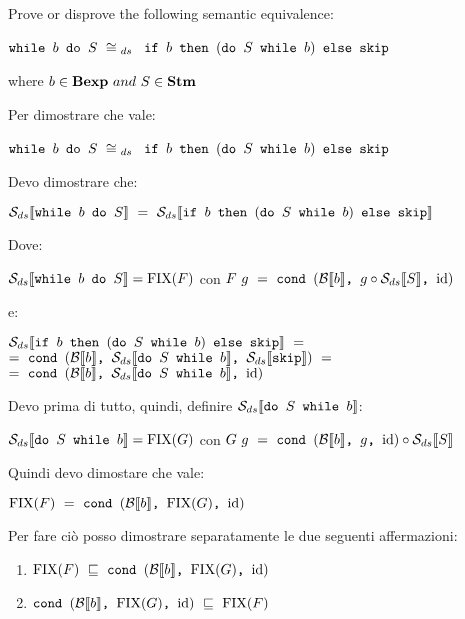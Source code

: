 \newcommand{\dSwb}[2]
{
    \mbox{\normalfont{\texttt{do }}}
    #1
    \textrm{\normalfont{\texttt{ while }}}
    #2
}
\newcommand{\exTen}
{
	$ \wbS{b}{S} ~\cong{}_{ds}~$
	{$\ifABC{b}{(\dSwb{S}{b})}{\skipistr}$}
}
\newcommand{\Sds}{\dsCtxt{S}}
\newcommand{\mineq}{\sqsubseteq}
\newcommand{\unionsem}[1]{\bigsqcup\limits_{n\geq{}0}}

{
	Prove or disprove the following semantic equivalence:
	\begin{center}
		\exTen{}
	\end{center}
	where $b\in\mbox{\textbf{Bexp}}~and~S\in\mbox{\textbf{Stm}}$
}
{
    Per dimostrare che vale:
    \begin{center}
    \exTen{}
    \end{center}
    Devo dimostrare che:
    \begin{center}
    $\dsCtxt{\wbS{b}{S}}~=~
    \dsCtxt{\ifABC{b}{(\dSwb{S}{b})}{\skipistr}}$
    \end{center}
    Dove:
    \begin{center}
    $\mathcal{S}_{ds}\llbracket \mbox{\normalfont{\texttt{while }}} b \textrm{\normalfont{\texttt{ do }}} S \rrbracket=\textrm{\normalfont{FIX}}(F)$ con 
    $F~g~=~\cond{b}{g \circ{} \Sds{}}{\idDS}$ \\
    \end{center}
    e:
    \begin{center}
    $\dsCtxt{\ifABC{b}{(\dSwb{S}{b})}{\skipistr}}~=$\\$=~
    \cond{b}{\dsCtxt{\dSwb{S}{b}}}{\dsCtxt{\skipistr}}~=$\\$=~
    \cond{b}{\dsCtxt{\dSwb{S}{b}}}{\idDS}$
    \end{center}
    Devo prima di tutto, quindi, definire $\dsCtxt{\dSwb{S}{b}}$:
    \begin{center}
    $\dsCtxt{\dSwb{S}{b}}=\fixp{G}$ con 
    $G~g~=~\cond{b}{g}{\idDS} \circ \Sds$
    \end{center}
    Quindi devo dimostare che vale:
    \begin{center}
    $\textrm{\normalfont{FIX}}(F)~=~\mbox{\normalfont{\texttt{cond }}} (\mathcal{B}{}\llbracket b \rrbracket \textrm{\normalfont{\texttt{, }}} \textrm{\normalfont{FIX}}(G) \textrm{\normalfont{\texttt{, }}} \textrm{\normalfont{id}})$
    \end{center}
    Per fare ciò posso dimostrare separatamente le due seguenti affermazioni:
    \begin{enumerate}
    \item $\fixp{F}~\mineq~\cond{b}{\fixp{G}}{\idDS}$
    \item $\cond{b}{\fixp{G}}{\idDS}~\mineq~\fixp{F}$
    \end{enumerate}

}
